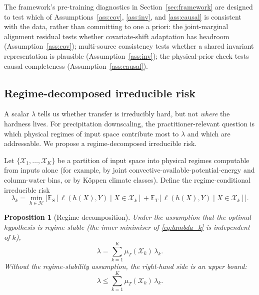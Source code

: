 \documentclass{article}
\newtheorem{proposition}{Proposition}
\begin{document}
The framework's pre-training diagnostics in
Section~\ref{sec:framework} are designed to test which of
Assumptions~\ref{ass:cov}, \ref{ass:inv}, and \ref{ass:causal} is
consistent with the data, rather than committing to one a priori:
the joint-marginal alignment residual tests whether covariate-shift
adaptation has headroom (Assumption~\ref{ass:cov}); multi-source
consistency tests whether a shared invariant representation is
plausible (Assumption~\ref{ass:inv}); the physical-prior check tests
causal completeness (Assumption~\ref{ass:causal}).

\subsection{Regime-decomposed irreducible risk}
\label{sec:lambda_k}

A scalar $\lambda$ tells us whether transfer is irreducibly hard, but
not \emph{where} the hardness lives. For precipitation downscaling, the
practitioner-relevant question is which physical regimes of input space
contribute most to $\lambda$ and which are addressable. We propose a
regime-decomposed irreducible risk.

Let $\{\mathcal{X}_1, \ldots, \mathcal{X}_K\}$ be a partition of input
space into physical regimes computable from inputs alone (for example,
by joint convective-available-potential-energy and column-water bins,
or by Köppen climate classes). Define the regime-conditional
irreducible risk
\begin{equation}
\lambda_k = \min_{h \in \mathcal{H}}
\Big[
\mathbb{E}_S\!\left[\ell(h(X), Y) \mid X \in \mathcal{X}_k\right]
+ \mathbb{E}_T\!\left[\ell(h(X), Y) \mid X \in \mathcal{X}_k\right]
\Big].
\label{eq:lambda_k}
\end{equation}

\begin{proposition}[Regime decomposition]
\label{prop:decomp}
Under the assumption that the optimal hypothesis is regime-stable
(the inner minimiser of \eqref{eq:lambda_k} is independent of $k$),
\begin{equation}
\lambda = \sum_{k=1}^K \mu_T(\mathcal{X}_k)\, \lambda_k.
\end{equation}
Without the regime-stability assumption, the right-hand side is an
upper bound:
\begin{equation}
\lambda \le \sum_{k=1}^K \mu_T(\mathcal{X}_k)\, \lambda_k.
\end{equation}
\end{proposition}
\end{document}
